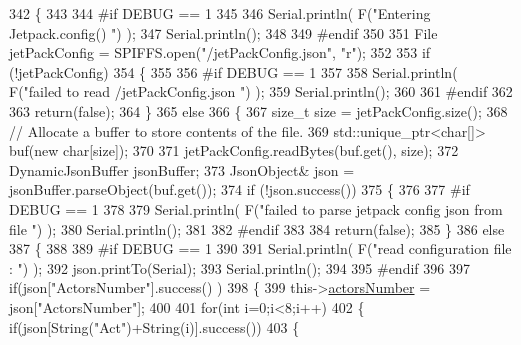 \begin{DoxyCode}
342 \{
343 
344 \textcolor{preprocessor}{#if DEBUG == 1 }
345 
346     Serial.println( F(\textcolor{stringliteral}{"Entering Jetpack.config() "}) );
347     Serial.println();
348 
349 \textcolor{preprocessor}{#endif}
350 
351     File jetPackConfig = SPIFFS.open(\textcolor{stringliteral}{"/jetPackConfig.json"}, \textcolor{stringliteral}{"r"});
352 
353     \textcolor{keywordflow}{if} (!jetPackConfig) 
354     \{
355 
356 \textcolor{preprocessor}{    #if DEBUG == 1 }
357 
358         Serial.println( F(\textcolor{stringliteral}{"failed to read /jetPackConfig.json "}) );
359         Serial.println();
360 
361 \textcolor{preprocessor}{    #endif}
362 
363         \textcolor{keywordflow}{return}(\textcolor{keyword}{false});
364     \}
365     \textcolor{keywordflow}{else}
366     \{
367         \textcolor{keywordtype}{size\_t} size = jetPackConfig.size();
368         \textcolor{comment}{// Allocate a buffer to store contents of the file.}
369         std::unique\_ptr<char[]> buf(\textcolor{keyword}{new} \textcolor{keywordtype}{char}[size]);
370 
371         jetPackConfig.readBytes(buf.get(), size);
372         DynamicJsonBuffer jsonBuffer;
373         JsonObject& json = jsonBuffer.parseObject(buf.get());
374         \textcolor{keywordflow}{if} (!json.success()) 
375         \{
376         
377 \textcolor{preprocessor}{        #if DEBUG == 1 }
378 
379             Serial.println( F(\textcolor{stringliteral}{"failed to parse jetpack config json from file "}) );
380             Serial.println();
381 
382 \textcolor{preprocessor}{        #endif}
383 
384             \textcolor{keywordflow}{return}(\textcolor{keyword}{false});
385         \} 
386         \textcolor{keywordflow}{else}
387         \{ 
388         
389 \textcolor{preprocessor}{        #if DEBUG == 1 }
390 
391             Serial.println( F(\textcolor{stringliteral}{"read configuration file : "}) );
392             json.printTo(Serial);
393             Serial.println();
394         
395 \textcolor{preprocessor}{        #endif}
396   
397             \textcolor{keywordflow}{if}(json[\textcolor{stringliteral}{"ActorsNumber"}].success() )
398             \{
399                 this->\hyperlink{classJetpack_a52c86319cb3f7f1ab744a64db18a7ba5}{actorsNumber} = json[\textcolor{stringliteral}{"ActorsNumber"}]; 
400             
401                 \textcolor{keywordflow}{for}(\textcolor{keywordtype}{int} i=0;i<8;i++)
402                 \{   \textcolor{keywordflow}{if}(json[String(\textcolor{stringliteral}{"Act"})+String(i)].success())
403                     \{

\end{DoxyCode}
